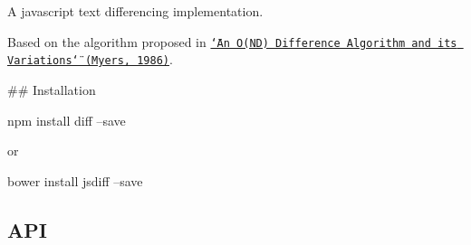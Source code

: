 \href{http://travis-ci.org/kpdecker/jsdiff}{\tt } \href{https://saucelabs.com/u/jsdiff}{\tt }

A javascript text differencing implementation.

Based on the algorithm proposed in \href{http://citeseerx.ist.psu.edu/viewdoc/summary?doi=10.1.1.4.6927}{\tt \char`\"{}\+An O(\+N\+D) Difference Algorithm and its Variations\char`\"{} (Myers, 1986)}.

\#\# Installation 
\begin{DoxyCode}
npm install diff --save
\end{DoxyCode}
 or 
\begin{DoxyCode}
bower install jsdiff --save
\end{DoxyCode}


\subsection*{A\+PI}


